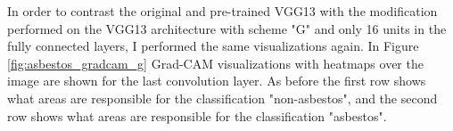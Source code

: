 \begin{figure}[!h]
{}
\label{fig:vgg13_filter_activation}
\end{figure}

In order to contrast the original and pre-trained VGG13 with the modification performed on the VGG13 architecture with scheme "G" and only 16 units in the fully connected layers, I performed the same visualizations again. In Figure \ref{fig:asbestos_gradcam_g} Grad-CAM visualizations with heatmaps over the image are shown for the last convolution layer. As before the first row shows what areas are responsible for the classification "non-asbestos", and the second row shows what areas are responsible for the classification "asbestos".


